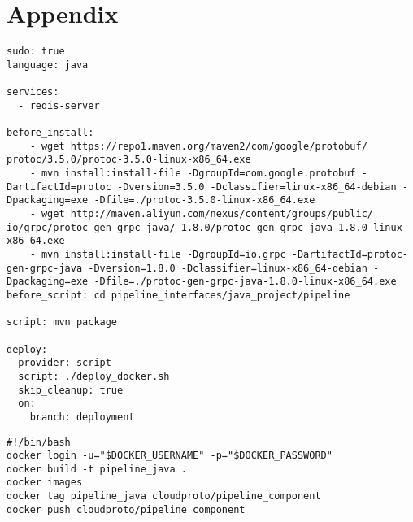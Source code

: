 \section{Appendix}

\begin{lstlisting}[label=lst:pipelineyaml, postbreak=\mbox{\textcolor{red}{$\hookrightarrow$}\space},breaklines=true, basicstyle=\small,caption=.travis.yaml for pipeline component]
sudo: true
language: java

services:
  - redis-server

before_install:
    - wget https://repo1.maven.org/maven2/com/google/protobuf/ protoc/3.5.0/protoc-3.5.0-linux-x86_64.exe
    - mvn install:install-file -DgroupId=com.google.protobuf -DartifactId=protoc -Dversion=3.5.0 -Dclassifier=linux-x86_64-debian -Dpackaging=exe -Dfile=./protoc-3.5.0-linux-x86_64.exe
    - wget http://maven.aliyun.com/nexus/content/groups/public/ io/grpc/protoc-gen-grpc-java/ 1.8.0/protoc-gen-grpc-java-1.8.0-linux-x86_64.exe
    - mvn install:install-file -DgroupId=io.grpc -DartifactId=protoc-gen-grpc-java -Dversion=1.8.0 -Dclassifier=linux-x86_64-debian -Dpackaging=exe -Dfile=./protoc-gen-grpc-java-1.8.0-linux-x86_64.exe
before_script: cd pipeline_interfaces/java_project/pipeline

script: mvn package

deploy:
  provider: script
  script: ./deploy_docker.sh
  skip_cleanup: true
  on:
    branch: deployment
\end{lstlisting}


\begin{lstlisting}[label=lst:dockerdeploy, basicstyle=\small,caption=docker deployment script  for pipeline component]
#!/bin/bash
docker login -u="$DOCKER_USERNAME" -p="$DOCKER_PASSWORD"
docker build -t pipeline_java .
docker images
docker tag pipeline_java cloudproto/pipeline_component
docker push cloudproto/pipeline_component
\end{lstlisting}

